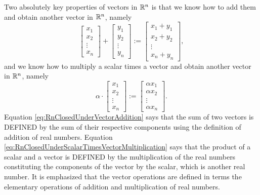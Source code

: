 \begin{tcolorbox}
Two absolutely key properties of vectors in $\mathbb R^n$ is that we know how to add them and obtain another vector in $\mathbb R^n$, namely
\begin{equation}
    \label{eq:RnClosedUnderVectorAddition}
  \begin{bmatrix} x_1 \\ x_2 \\ \vdots \\ x_n\end{bmatrix} + 
 \begin{bmatrix} y_1 \\ y_2 \\ \vdots \\ y_n\end{bmatrix} :=
   \begin{bmatrix} x_1 + y_1\\ x_2 + y_2 \\ \vdots \\ x_n + y_n\end{bmatrix},
\end{equation}
and we know how to multiply a scalar times a vector and obtain another vector in $\mathbb R^n$, namely
\begin{equation}
    \label{eq:RnClosedUnderScalarTimesVectorMultiplication}
  \alpha \cdot \begin{bmatrix} x_1 \\ x_2 \\ \vdots \\ x_n\end{bmatrix} 
  :=
   \begin{bmatrix} \alpha x_1 \\ \alpha x_2 \\ \vdots \\ \alpha x_n\end{bmatrix}.
\end{equation}
Equation \eqref{eq:RnClosedUnderVectorAddition} says that the sum of two vectors is DEFINED by the sum of their respective components using the definition of addition of real numbers. Equation \eqref{eq:RnClosedUnderScalarTimesVectorMultiplication} says that the product of a scalar and a vector is DEFINED by the multiplication of the real numbers constituting the components of the vector by the scalar, which is another real number. It is emphasized that the vector operations are defined in terms the elementary operations of addition and multiplication of real numbers.\\


\end{tcolorbox}
